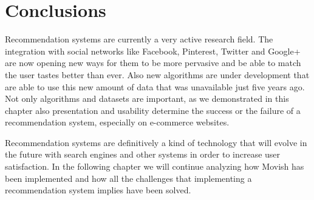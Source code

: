 \section{Conclusions}
\label{sec:overview_conclusions}

Recommendation systems are currently a very active research field. The integration with social networks like Facebook, Pinterest, Twitter and Google+ are now opening new ways for them to be more pervasive and be able to match the user tastes better than ever. Also new algorithms are under development that are able to use this new amount of data that was unavailable just five years ago. Not only algorithms and datasets are important, as we demonstrated in this chapter also presentation and usability determine the success or the failure of a recommendation system, especially on e-commerce websites.

Recommendation systems are definitively a kind of technology that will evolve in the future with search engines and other systems in order to increase user satisfaction. In the following chapter we will continue analyzing how Movish has been implemented and how all the challenges that implementing a recommendation system implies have been solved.

\acresetall